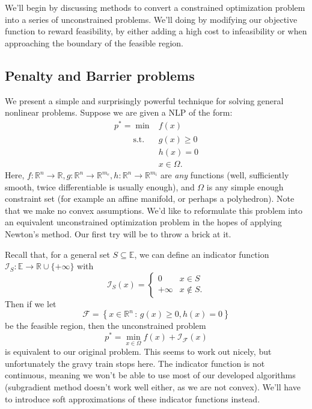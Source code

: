 \documentclass[11pt]{article}
\numberwithin{equation}{section}
\theoremstyle{definition}
\newcommand{\bE}{\mathbb{E}}
\newcommand{\bR}{\mathbb{R}}
\newcommand{\cF}{\mathcal{F}}
\newcommand{\cI}{\mathcal{I}}
\newcommand{\set}[2]{\left\{#1\,:\,#2\right\}}
\newcommand{\tst}{\text{s.t.}}
\begin{document}
We'll begin by discussing methods to convert a constrained optimization problem into a series of unconstrained problems. We'll doing by modifying our objective function to reward feasibility, by either adding a high cost to infeasibility or when approaching the boundary of the feasible region.
\subsection{Penalty and Barrier problems}
We present a simple and surprisingly powerful technique for solving general nonlinear problems. Suppose we are given a NLP of the form:
\begin{equation}
    \label{eqpbnlp}
    \begin{array}{ccc}
         p^*=\min & f(x)  \\
         \phantom{p^*=}\tst & g(x)\ge 0\\
             & h(x)=0\\
              & x\in\Omega.
    \end{array}
\end{equation}
Here, $f:\bR^n\to\bR, g:\bR^n\to\bR^{m_e}, h:\bR^n\to\bR^{m_i}$ are \textit{any} functions (well, sufficiently smooth, twice differentiable is usually enough), and $\Omega$ is any simple enough constraint set (for example an affine manifold, or perhaps a polyhedron). Note that we make no convex assumptions. We'd like to reformulate this problem into an equivalent unconstrained optimization problem in the hopes of applying Newton's method. Our first try will be to throw a brick at it.

Recall that, for a general set $S\subseteq\bE$, we can define an indicator function $\cI_S:\bE\to\bR\cup\{+\infty\}$ with
\begin{equation}
    \cI_S(x)=\begin{cases}
        0 & x\in S\\
        +\infty & x\not\in S.
    \end{cases}
\end{equation}
Then if we let
\begin{equation}
    \cF = \set{x\in\bR^n}{g(x)\ge 0, h(x) =0}
\end{equation}
be the feasible region, then the unconstrained problem
\begin{equation}
    p^*=\min_{x\in\Omega} f(x)+\cI_\cF(x)
\end{equation}
is equivalent to our original problem. This seems to work out nicely, but unfortunately the gravy train stops here. The indicator function is not continuous, meaning we won't be able to use most of our developed algorithms (subgradient method doesn't work well either, as we are not convex). We'll have to introduce soft approximations of these indicator functions instead.
\end{document}
